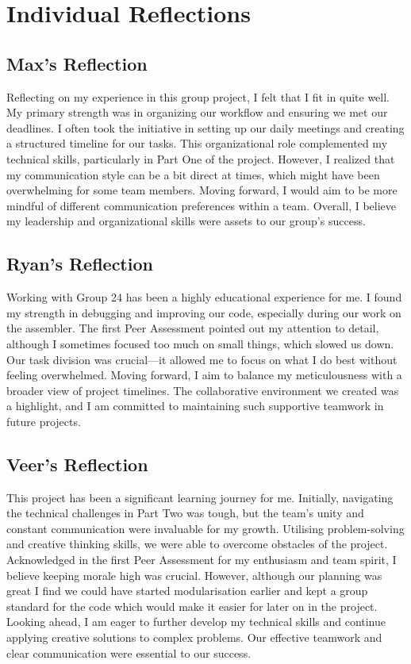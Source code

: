 \documentclass{article}
\begin{document}
\section{Individual Reflections}
\label{sec:individual_reflections}

\subsection{Max's Reflection}
Reflecting on my experience in this group project, I felt that I fit in quite well. My primary strength was in organizing our workflow and ensuring we met our deadlines. I often took the initiative in setting up our daily meetings and creating a structured timeline for our tasks. This organizational role complemented my technical skills, particularly in Part One of the project. However, I realized that my communication style can be a bit direct at times, which might have been overwhelming for some team members. Moving forward, I would aim to be more mindful of different communication preferences within a team. Overall, I believe my leadership and organizational skills were assets to our group's success.

\subsection{Ryan's Reflection}
Working with Group 24 has been a highly educational experience for me. I found my strength in debugging and improving our code, especially during our work on the assembler. The first Peer Assessment pointed out my attention to detail, although I sometimes focused too much on small things, which slowed us down. Our task division was crucial—it allowed me to focus on what I do best without feeling overwhelmed. Moving forward, I aim to balance my meticulousness with a broader view of project timelines. The collaborative environment we created was a highlight, and I am committed to maintaining such supportive teamwork in future projects.

\subsection{Veer's Reflection}
This project has been a significant learning journey for me. Initially, navigating the technical challenges in Part Two was tough, but the team's unity and constant communication were invaluable for my growth. Utilising problem-solving and creative thinking skills, we were able to overcome obstacles of the project. Acknowledged in the first Peer Assessment for my enthusiasm and team spirit, I believe keeping morale high was crucial. However, although our planning was great I find we could have started modularisation earlier and kept a group standard for the code which would make it easier for later on in the project. Looking ahead, I am eager to further develop my technical skills and continue applying creative solutions to complex problems. Our effective teamwork and clear communication were essential to our success.
\end{document}
